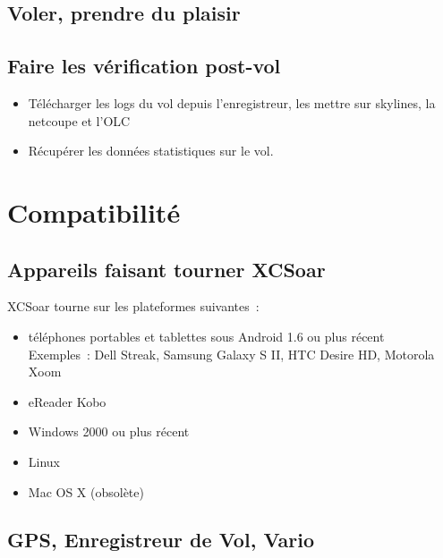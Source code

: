 \subsection*{Voler, prendre du plaisir}
\vspace{4em}

\subsection*{Faire les vérification post-vol}
\begin{itemize}
\item Télécharger les logs du vol depuis l'enregistreur, les mettre sur skylines, la netcoupe et l'OLC
\item Récupérer les données statistiques sur le vol.
\end{itemize}
\newpage

\section{Compatibilité}

\subsection*{Appareils faisant tourner XCSoar}

XCSoar tourne sur les plateformes suivantes~:
\begin{itemize}
\item téléphones portables et tablettes sous Android 1.6 ou plus récent \\
 Exemples~: Dell Streak, Samsung Galaxy S II, HTC Desire HD,
 Motorola Xoom
\item eReader Kobo
\item Windows 2000 ou plus récent
\item Linux
\item Mac OS X (obsolète)
\end{itemize}

\subsection*{GPS, Enregistreur de Vol, Vario}


